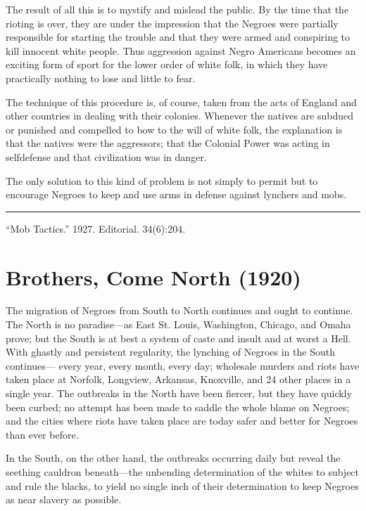 \documentclass[letterpaper,10pt,english]{jupyterBook}
\begin{document}
\sphinxAtStartPar
The result of all this is to mystify and mislead the public. By the time that the rioting is over, they are under the impression that the Negroes were partially responsible for starting the trouble and that they were armed and conspiring to kill innocent white people. Thus aggression against Negro Americans becomes an exciting form of sport for the lower order of white folk, in which they have practically nothing to lose and little to fear.

\sphinxAtStartPar
The technique of this procedure is, of course, taken from the acts of England and other countries in dealing with their colonies. Whenever the natives are subdued or punished and compelled to bow to the will of white folk, the explanation is that the natives were the aggressors; that the Colonial Power was acting in self\sphinxhyphen{}defense and that civilization was in danger.

\sphinxAtStartPar
The only solution to this kind of problem is not simply to permit but to encourage Negroes to keep and use arms in defense against lynchers and mobs.


\bigskip\hrule\bigskip


\sphinxAtStartPar
{} “Mob Tactics.” 1927. Editorial.  34(6):204.


\section{Brothers, Come North (1920)}
\label{\detokenize{Volumes/19/03/brothers_come_north:brothers-come-north-1920}}\label{\detokenize{Volumes/19/03/brothers_come_north::doc}}
\sphinxAtStartPar
The migration of Negroes from South to North continues and ought to continue. The North is no paradise—as East St. Louis, Washington, Chicago, and Omaha prove; but the South is at best a system of caste and insult and at worst a Hell. With ghastly and persistent regularity, the lynching of Negroes in the South continues— every year, every month, every day; wholesale murders and riots have taken place at Norfolk, Longview, Arkansas, Knoxville, and 24 other places in a single year. The outbreaks in the North have been fiercer, but they have quickly been curbed; no attempt has been made to saddle the whole blame on Negroes; and the cities where riots have taken place are today safer and better for Negroes than ever before.

\sphinxAtStartPar
In the South, on the other hand, the outbreaks occurring daily but reveal the seething cauldron beneath—the unbending determination of the whites to subject and rule the blacks, to yield no single inch of their determination to keep Negroes as near slavery as possible.
\end{document}
